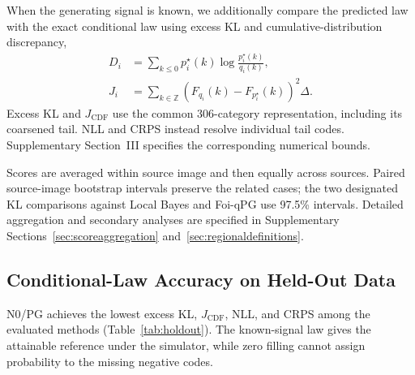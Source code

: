 \documentclass[10pt,twocolumn,journal]{IEEEtran}
\begin{document}
When the generating signal is known, we additionally compare the predicted law with the exact conditional law using excess KL and cumulative-distribution discrepancy,
\begin{align}
D_i&=\sum_{k\leq0}p^{\star}_i(k)\log\frac{p^{\star}_i(k)}{q_i(k)},\label{eq:kl}\\
J_i&=\sum_{k\in\mathbb Z}\left(F_{q_i}(k)-F_{p^{\star}_i}(k)\right)^2\Delta.\label{eq:cdf}
\end{align}
Excess KL and $J_{\mathrm{CDF}}$ use the common 306-category representation, including its coarsened tail. NLL and CRPS instead resolve individual tail codes. Supplementary Section~III specifies the corresponding numerical bounds.

Scores are averaged within source image and then equally across sources. Paired source-image bootstrap intervals preserve the related cases; the two designated KL comparisons against Local Bayes and Foi-qPG use 97.5\% intervals. Detailed aggregation and secondary analyses are specified in Supplementary Sections~\ref{sec:scoreaggregation} and~\ref{sec:regionaldefinitions}.

\subsection{Conditional-Law Accuracy on Held-Out Data}
N0/PG achieves the lowest excess KL, $J_{\mathrm{CDF}}$, NLL, and CRPS among the evaluated methods (Table~\ref{tab:holdout}). The known-signal law gives the attainable reference under the simulator, while zero filling cannot assign probability to the missing negative codes.
\end{document}
